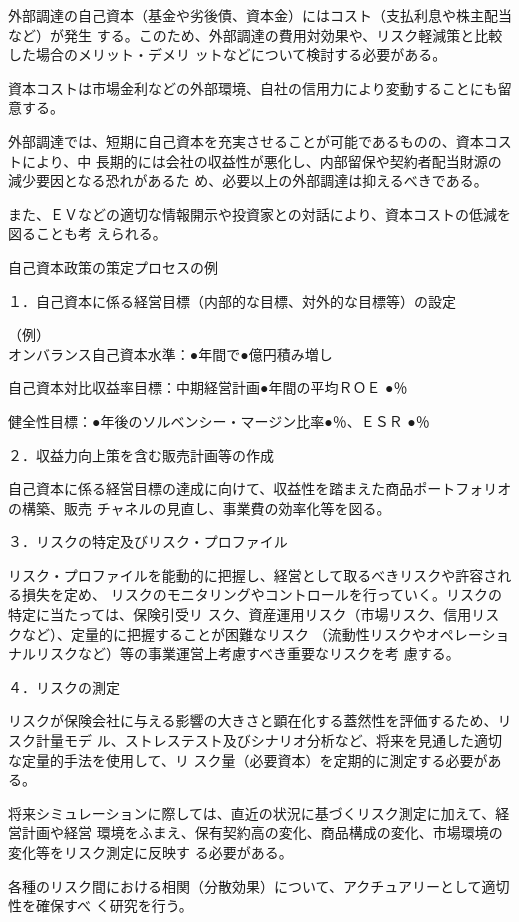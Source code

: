 \documentclass[report,gutter=10mm,fore-edge=10mm,uplatex,dvipdfmx]{jlreq}
\begin{document}
外部調達の自己資本（基金や劣後債、資本金）にはコスト（支払利息や株主配当など）が発生
する。このため、外部調達の費用対効果や、リスク軽減策と比較した場合のメリット・デメリ
ットなどについて検討する必要がある。

資本コストは市場金利などの外部環境、自社の信用力により変動することにも留意する。

外部調達では、短期に自己資本を充実させることが可能であるものの、資本コストにより、中
長期的には会社の収益性が悪化し、内部留保や契約者配当財源の減少要因となる恐れがあるた
め、必要以上の外部調達は抑えるべきである。

また、ＥＶなどの適切な情報開示や投資家との対話により、資本コストの低減を図ることも考
えられる。

自己資本政策の策定プロセスの例

１．自己資本に係る経営目標（内部的な目標、対外的な目標等）の設定

（例）\\
オンバランス自己資本水準：●年間で●億円積み増し

自己資本対比収益率目標：中期経営計画●年間の平均ＲＯＥ ●％

健全性目標：●年後のソルベンシー・マージン比率●％、ＥＳＲ ●％

２．収益力向上策を含む販売計画等の作成

自己資本に係る経営目標の達成に向けて、収益性を踏まえた商品ポートフォリオの構築、販売
チャネルの見直し、事業費の効率化等を図る。

３．リスクの特定及びリスク・プロファイル

リスク・プロファイルを能動的に把握し、経営として取るべきリスクや許容される損失を定め、
リスクのモニタリングやコントロールを行っていく。リスクの特定に当たっては、保険引受リ
スク、資産運用リスク（市場リスク、信用リスクなど）、定量的に把握することが困難なリスク
（流動性リスクやオペレーショナルリスクなど）等の事業運営上考慮すべき重要なリスクを考
慮する。

４．リスクの測定

リスクが保険会社に与える影響の大きさと顕在化する蓋然性を評価するため、リスク計量モデ
ル、ストレステスト及びシナリオ分析など、将来を見通した適切な定量的手法を使用して、リ
スク量（必要資本）を定期的に測定する必要がある。

将来シミュレーションに際しては、直近の状況に基づくリスク測定に加えて、経営計画や経営
環境をふまえ、保有契約高の変化、商品構成の変化、市場環境の変化等をリスク測定に反映す
る必要がある。

各種のリスク間における相関（分散効果）について、アクチュアリーとして適切性を確保すべ
く研究を行う。
\end{document}

